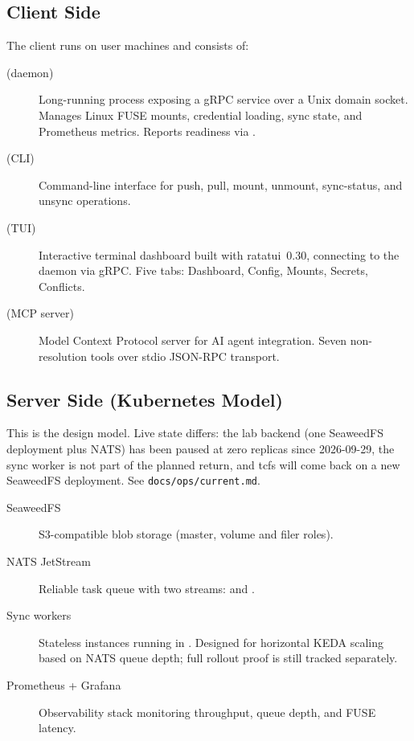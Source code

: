 \documentclass[11pt,a4paper]{article}
\begin{document}
\subsection{Client Side}

The client runs on user machines and consists of:

\begin{description}
  \item[\tcfsd{} (daemon)] Long-running process exposing a gRPC service over a
    Unix domain socket. Manages Linux FUSE mounts, credential loading, sync state,
    and Prometheus metrics. Reports readiness via .
  \item[\tcfs{} (CLI)] Command-line interface for push, pull, mount, unmount,
    sync-status, and unsync operations.
  \item[ (TUI)] Interactive terminal dashboard built with
    ratatui~0.30, connecting to the daemon via gRPC. Five tabs: Dashboard,
    Config, Mounts, Secrets, Conflicts.
  \item[ (MCP server)] Model Context Protocol server for AI
    agent integration. Seven non-resolution tools over stdio JSON-RPC transport.
\end{description}

\subsection{Server Side (Kubernetes Model)}

This is the design model. Live state differs: the lab backend (one SeaweedFS
deployment plus NATS) has been paused at zero replicas since 2026-09-29, the
sync worker is not part of the planned return, and tcfs will come back on a
new SeaweedFS deployment. See \texttt{docs/ops/current.md}.

\begin{description}
  \item[SeaweedFS] S3-compatible blob storage (master, volume and filer
    roles).
  \item[NATS JetStream] Reliable task queue with two streams:
     and .
  \item[Sync workers] Stateless \tcfsd{} instances running in
    . Designed for horizontal KEDA scaling based on NATS
    queue depth; full rollout proof is still tracked separately.
  \item[Prometheus + Grafana] Observability stack monitoring throughput,
    queue depth, and FUSE latency.
\end{description}
\end{document}
